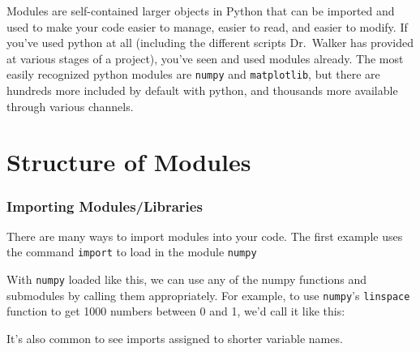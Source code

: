 Modules are self-contained larger objects in Python that can be imported
and used to make your code easier to manage, easier to read, and easier
to modify. If you've used python at all (including the different scripts
Dr.~Walker has provided at various stages of a project), you've seen and
used modules already. The most easily recognized python modules are
\texttt{numpy} and \texttt{matplotlib}, but there are hundreds more
included by default with python, and thousands more available through
various channels.
\section{Structure of Modules}

\hypertarget{importing-moduleslibraries}{%
\subsubsection{Importing
Modules/Libraries}\label{importing-moduleslibraries}}

There are many ways to import modules into your code. The first example
uses the command \texttt{import} to load in the module \texttt{numpy}

\begin{Shaded}
\begin{Highlighting}[]
\end{Highlighting}
\end{Shaded}

With \texttt{numpy} loaded like this, we can use any of the numpy
functions and submodules by calling them appropriately. For example, to
use \texttt{numpy}'s \texttt{linspace} function to get 1000 numbers
between 0 and 1, we'd call it like this:

\begin{Shaded}
\begin{Highlighting}[]
\OperatorTok{=}\NormalTok{,}\NormalTok{,}\NormalTok{)}
\end{Highlighting}
\end{Shaded}

It's also common to see imports assigned to shorter variable names.

\begin{Shaded}
\begin{Highlighting}[]
\end{Highlighting}
\end{Shaded}

